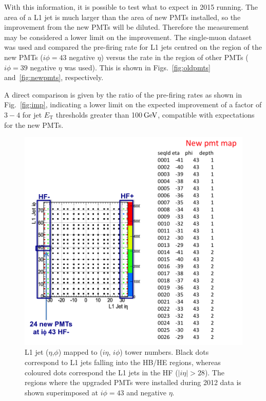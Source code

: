 \documentclass[11pt]{cmspaperpdf}
\newcommand{\GeV}{\ensuremath{\,\text{Ge\hspace{-.08em}V}}\xspace}
\newcommand{\et}{\ensuremath{E_{\textrm{T}}}\xspace}
\begin{document}
With this information, it is possible to test what to expect in 2015 running. The area of a L1 jet is much larger than the area of new PMTs installed, so the improvement from the new PMTs will be diluted. Therefore the measurement may be considered a lower limit on the improvement. The single-muon dataset was used and compared the pre-firing rate for L1 jets centred on the region of the new PMTs ($i \phi=43$ negative $\eta$) versus the rate in the region of other PMTs ($i \phi=39$ negative $\eta$ was used). This is shown in Figs.~\ref{fig:oldpmts} and~\ref{fig:newpmts}, respectively.

A direct comparison is given by the ratio of the pre-firing rates as shown in Fig.~\ref{fig:imp}, indicating a lower limit on the expected improvement of a factor of $3-4$ for jet \et thresholds greater than 100\GeV, compatible with expectations for the new PMTs.


\begin{figure}
\centering
\includegraphics[scale=0.7]{plots/upgradedPMTs_regions_in2012.png}
\caption{L1 jet ($\eta$,$\phi$) mapped to ($i \eta$, $i \phi$) tower numbers. Black dots correspond to L1 jets falling into the HB/HE regions, whereas coloured dots correspond the L1 jets in the HF ($| i \eta| > 28$). The regions where the upgraded PMTs were installed during 2012 data is shown superimposed at $i \phi=43$ and negative $\eta$. }
\label{fig:newpmtmap} 
\end{figure}
 
\end{document}
